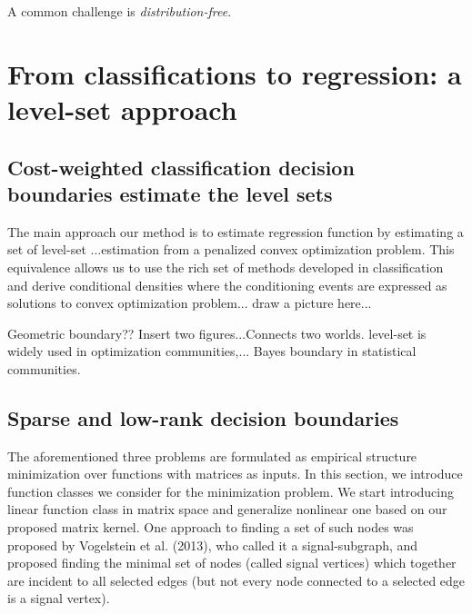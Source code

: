 \documentclass[mathptm]{statsoc}
\begin{document}
A common challenge is \emph{distribution-free}. 


\section{From classifications to regression: a level-set approach}

\subsection{Cost-weighted classification decision boundaries estimate the level sets}
The main approach our method is to estimate regression function by estimating a set of level-set ...estimation from a penalized convex optimization problem. This equivalence allows us to use the rich set of methods developed in classification and derive conditional densities where the conditioning events are expressed as solutions to convex optimization problem... draw a picture here...

Geometric boundary?? Insert two figures...Connects two worlds. level-set is widely used in optimization communities,... Bayes boundary in statistical communities. 

\subsection{Sparse and low-rank decision boundaries}\label{sec:fcn class}
The aforementioned three problems are formulated as empirical structure minimization over functions with matrices as inputs.
In this section, we introduce function classes we consider for the minimization problem. We start introducing linear function class in matrix space and generalize nonlinear one based on our proposed matrix kernel. 
One approach to finding a set of such nodes was proposed by Vogelstein et al. (2013), who called it a signal-subgraph, and proposed finding the minimal set of nodes (called signal vertices) which together are incident to all selected edges (but not every node connected to a selected edge is a signal vertex).
\end{document}
